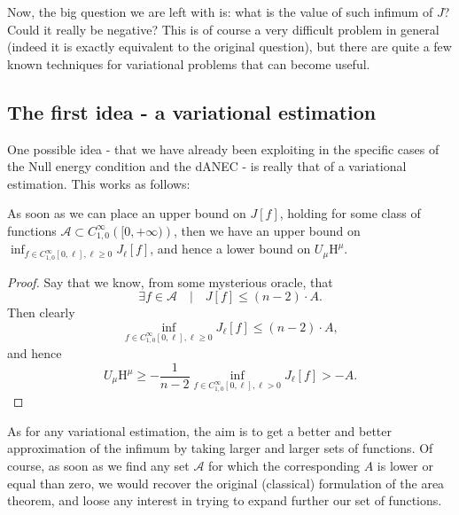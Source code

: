 
Now, the big question we are left with is: what is the value of such infimum of \(J\)? Could it really be negative?
\noindent
This is of course a very difficult problem in general (indeed it is exactly equivalent to the original question), but there are quite a few known techniques for variational problems that can become useful.

\subsection{The first idea - a variational estimation}
\label{subsec:variational-estimation}
One possible idea - that we have already been exploiting in the specific cases of the Null energy condition and the dANEC - is really that of a variational estimation. This works as follows:
\begin{lemma}
	As soon as we can place an upper bound on \(J[f]\), holding for some class of functions \(\mathcal{A} \subset C^{\infty}_{1,0}\left([0,+\infty)\right)\), then we have an upper bound on \(\inf_{f\in C^{\infty}_{1,0}[0, \ell], \ell \ge 0}J_{\ell}[f]\), and hence a lower bound on \(U_{\mu}\mathrm{H}^{\mu}\).
\end{lemma}
	\begin{proof}
		Say that we know, from some mysterious oracle, that
		\[
		\exists f \in \mathcal{A} \quad\vert\quad J[f] \le (n-2) \cdot A.
		\]
		Then clearly
		\[
			\inf_{f\in C^{\infty}_{1,0}[0, \ell], \ell \ge 0}J_{\ell}[f] \le (n-2) \cdot A,
		\]
		and hence
		\[
			U_{\mu}\mathrm{H}^{\mu} \ge -\frac{1}{n - 2} \inf_{f\in C^{\infty}_{1,0}[0, \ell], \ell > 0}J_{\ell}[f] > - A.
		\]
	\end{proof}
	As for any variational estimation, the aim is to get a better and better approximation of the infimum by taking larger and larger sets of functions. Of course, as soon as we find any set \(\mathcal{A}\) for which the corresponding \(A\) is lower or equal than zero, we would recover the original (classical) formulation of the area theorem, and loose any interest in trying to expand further our set of functions.

